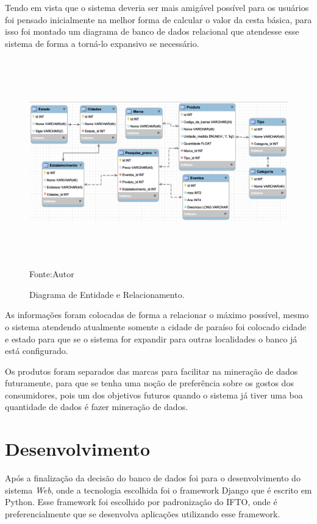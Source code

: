 \documentclass{ifto-tex}
\begin{document}
Tendo em vista que o sistema deveria ser mais amigável  possível para os usuários foi pensado inicialmente na melhor forma de calcular o valor da cesta básica, para isso foi montado um diagrama de banco de dados relacional que atendesse esse sistema de forma a torná-lo expansivo se necessário.
\begin{figure}[H]
	\begin{center}
		\includegraphics[width=16.0cm, height= 9.0cm]{cestadiagrama.png}    %
		Fonte:Autor
		\caption{Diagrama de Entidade e Relacionamento.} 
		
		\label{fig:faces}
	\end{center}
\end{figure}
As informações foram colocadas de forma a relacionar o máximo possível, mesmo o sistema atendendo atualmente somente a cidade de paraíso foi colocado cidade e estado para que se o sistema for expandir para outras localidades o banco já está configurado.

Os produtos foram separados das marcas para facilitar na mineração de dados futuramente, para que se tenha uma noção de preferência sobre os gostos dos consumidores, pois um dos objetivos futuros quando o sistema já tiver uma boa quantidade de dados é fazer mineração de dados.



	
\chapter{Desenvolvimento}
	
Após a finalização da decisão do banco de dados foi para o desenvolvimento do sistema \textit{Web}, onde a tecnologia escolhida foi o framework Django que é escrito em Python. Esse framework foi escolhido por padronização do IFTO, onde é preferencialmente que se desenvolva aplicações utilizando esse framework.
\end{document}
